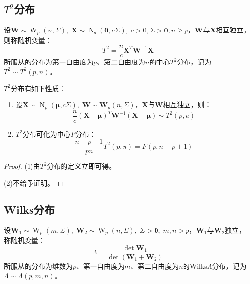 \subsection{$T^2$分布}
\begin{definition}
	设$\mathbf{W}\sim\operatorname{W}_p(n,\Sigma),\;\mathbf{X}\sim\operatorname{N}_p(\mathbf{0},c\Sigma),\;c>0,\Sigma>\mathbf{0},n\geqslant p$，$\mathbf{W}$与$\mathbf{X}$相互独立，则称随机变量：
	\begin{equation*}
		T^2=\frac{n}{c}\mathbf{X}^T\mathbf{W}^{-1}\mathbf{X}
	\end{equation*}
	所服从的分布为第一自由度为$p$、第二自由度为$n$的中心$T^2$分布，记为$T^2\sim T^2(p,n)$。
\end{definition}
\begin{property}\label{prop:T^2}
	$T^2$分布有如下性质：
	\begin{enumerate}
		\item 设$\mathbf{X}\sim\operatorname{N}_p(\boldsymbol{\mu},c\Sigma),\;\mathbf{W}\sim\mathbf{W}_p(n,\Sigma)$，$\mathbf{X}$与$\mathbf{W}$相互独立，则：
		\begin{equation*}
			\frac{n}{c}(\mathbf{X}-\boldsymbol{\mu})^T\mathbf{W}^{-1}(\mathbf{X}-\boldsymbol{\mu})\sim T^2(p,n)
		\end{equation*}
		\item $T^2$分布可化为中心$F$分布：
		\begin{equation*}
			\frac{n-p+1}{pn}T^2(p,n)=F(p,n-p+1)
		\end{equation*}
	\end{enumerate}
\end{property}
\begin{proof}
	(1)由$T^2$分布的定义立即可得。\par
	(2)不给予证明。
\end{proof}

\subsection{Wilks分布}
\begin{definition}
	设$\mathbf{W}_1\sim\operatorname{W}_p(m,\Sigma),\;\mathbf{W}_2\sim\operatorname{W}_p(n,\Sigma),\;\Sigma>\mathbf{0},\;m,n>p$，$\mathbf{W}_1$与$\mathbf{W}_2$独立，称随机变量：
	\begin{equation*}
		\varLambda=\frac{\det\mathbf{W}_1}{\det(\mathbf{W}_1+\mathbf{W}_2)}
	\end{equation*}
	所服从的分布为维数为$p$、第一自由度为$m$、第二自由度为$n$的Wilks$\varLambda$分布，记为$\varLambda\sim\varLambda(p,m,n)$。
\end{definition}